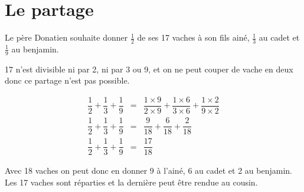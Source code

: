 \section{Le partage}

\begin{questions}
	\question Le père Donatien souhaite donner $\frac{1}{2}$ de ses 17 vaches à son fils ainé, $\frac{1}{3}$ au cadet et $\frac{1}{9}$ au benjamin.
	
	17 n'est divisible ni par 2, ni par 3 ou 9, et on ne peut couper de vache en deux donc ce partage n'est pas possible.
	
	\question 
	
		\begin{eqnarray*}
			\dfrac{1}{2} + \dfrac{1}{3} + \dfrac{1}{9} &=& \dfrac{1 \times 9}{2 \times 9} + \dfrac{1 \times 6}{3 \times 6} + \dfrac{1 \times 2}{9 \times 2}\\
			\dfrac{1}{2} + \dfrac{1}{3} + \dfrac{1}{9} &=& \dfrac{9}{18} + \dfrac{6}{18} + \dfrac{2}{18} \\
			\dfrac{1}{2} + \dfrac{1}{3} + \dfrac{1}{9} &=& \dfrac{17}{18}
		\end{eqnarray*}
	
		Avec 18 vaches on peut donc en donner 9 à l'ainé, 6 au cadet et 2 au  benjamin. Les 17 vaches sont réparties et la dernière peut être rendue au cousin.
\end{questions}